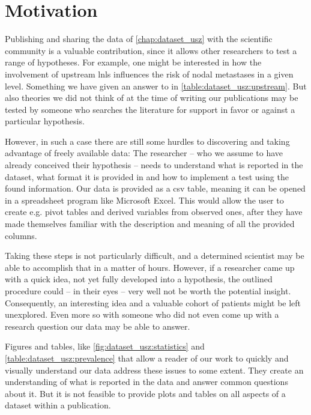 \documentclass[\relativeRoot/main.tex]{subfiles}
\begin{document}
\section{Motivation}
\label{sec:lyprox:motivation}

Publishing and sharing the data of \cref{chap:dataset_usz} with the scientific community is a valuable contribution, since it allows other researchers to test a range of hypotheses. For example, one might be interested in how the involvement of upstream \glspl{lnl} influences the risk of nodal metastases in a given level. Something we have given an answer to in \cref{table:dataset_usz:upstream}. But also theories we did not think of at the time of writing our publications \cite{ludwig_detailed_2021,ludwig_dataset_2021} may be tested by someone who searches the literature for support in favor or against a particular hypothesis.

However, in such a case there are still some hurdles to discovering and taking advantage of freely available data: The researcher -- who we assume to have already conceived their hypothesis -- needs to understand what is reported in the dataset, what format it is provided in and how to implement a test using the found information. Our data is provided as a \gls{csv} table, meaning it can be opened in a spreadsheet program like Microsoft Excel. This would allow the user to create e.g. pivot tables and derived variables from observed ones, after they have made themselves familiar with the description and meaning of all the provided columns.

Taking these steps is not particularly difficult, and a determined scientist may be able to accomplish that in a matter of hours. However, if a researcher came up with a quick idea, not yet fully developed into a hypothesis, the outlined procedure could -- in their eyes -- very well not be worth the potential insight. Consequently, an interesting idea and a valuable cohort of patients might be left unexplored. Even more so with someone who did not even come up with a research question our data may be able to answer.

Figures and tables, like \cref{fig:dataset_usz:statistics} and \cref{table:dataset_usz:prevalence} that allow a reader of our work to quickly and visually understand our data address these issues to some extent. They create an understanding of what is reported in the data and answer common questions about it. But it is not feasible to provide plots and tables on all aspects of a dataset within a publication.
\end{document}
